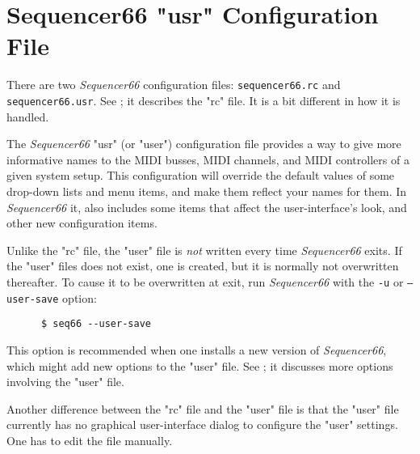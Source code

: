 %
%
%

\section{Sequencer66 "usr" Configuration File}
\label{sec:seq66_usr_file}

   There are two \textsl{Sequencer66} configuration files:
   \texttt{sequencer66.rc} and \texttt{sequencer66.usr}.
   See ; it describes the "rc" file.
   It is a bit different in how it is handled.

   The \textsl{Sequencer66} "usr" (or "user")
   configuration file provides a way to give more
   informative names to the MIDI busses, MIDI channels, and MIDI controllers of
   a given system setup.  This configuration will override the default values
   of some drop-down lists and menu items, and make them reflect your names for
   them.  In \textsl{Sequencer66} it, also includes some items that affect the
   user-interface's look, and other new configuration items.

   Unlike the "rc" file, the "user" file is \textsl{not} written every time
   \textsl{Sequencer66} exits.  If the "user" files does not exist, one is
   created, but it is normally not overwritten thereafter.  To
   cause it to be overwritten at exit, run \textsl{Sequencer66} with the
   \texttt{-u} or \texttt{--user-save} option:

   \begin{verbatim}
      $ seq66 --user-save
   \end{verbatim}

   This option is recommended when one installs a new version of
   \textsl{Sequencer66}, which might add new options to the "user" file.
   See ; it discusses more options involving the
   "user" file.

   Another difference between the "rc" file and the "user" file is that
   the "user" file currently has no graphical user-interface dialog to
   configure the "user" settings.  One has to edit the file manually.

